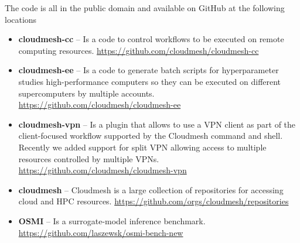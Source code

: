 \documentclass[utf8]{FrontiersinVancouver} %
\begin{document}
The code is all in the public domain and available on GitHub at the following locations

\begin{itemize}

\item {\bf cloudmesh-cc} -- Is a code to control workflows to be executed on
  remote computing
  resources. \url{https://github.com/cloudmesh/cloudmesh-cc}

\item {\bf cloudmesh-ee} -- Is a code to generate batch scripts for
  hyperparameter studies high-performance computers so they can be
  executed on different supercomputers by multiple
  accounts. \url{https://github.com/cloudmesh/cloudmesh-ee}


\item {\bf cloudmesh-vpn} -- Is a plugin that allows to use a VPN client as part of the client-focused workflow supported by the Cloudmesh command and shell. Recently we added support for split VPN allowing access to multiple resources controlled by multiple VPNs.
\url{https://github.com/cloudmesh/cloudmesh-vpn}

\item {\bf cloudmesh} -- Cloudmesh is a large collection of repositories for
  accessing cloud and HPC
  resources. \url{https://github.com/orgs/cloudmesh/repositories}

\item {\bf OSMI} -- Is a surrogate-model inference benchmark. \url{https://github.com/laszewsk/osmi-bench-new}



\end{itemize}







% 



\end{document}
